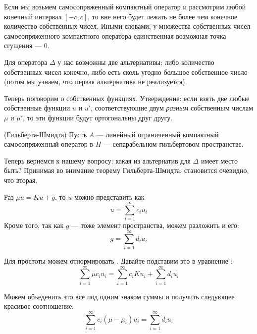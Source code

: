 

Если мы возьмем самосопряженный компактный оператор и рассмотрим любой конечный интервал $[-c, c]$, то вне него будет лежать не более чем конечное количество собственных чисел. Иными словами, у множества собственных чисел самосопряженного компактного оператора единственная возможная точка сгущения --- $0$.

Для оператора $\Delta$ у нас возможны две альтернативы: либо количество собственных чисел конечно, либо есть сколь угодно большое собственное число (потом мы узнаем, что первая альтернатива не реализуется).

Теперь поговорим о собственных функциях. Утверждение: если взять две любые собственные функции $u$ и $u'$, соответствующие двум \emph{разным} собственным числам $\mu$ и $\mu'$, то эти функции будут ортогональны друг другу.

\begin{thm*}(Гильберта-Шмидта)
  Пусть $A$ --- линейный ограниченный компактный самосопряженный оператор в $H$ --- сепарабельном гильбертовом пространстве. 
\end{thm*}

Теперь вернемся к нашему вопросу: какая из альтернатив для $\Delta$ имеет место быть? Принимая во внимание теорему Гильберта-Шмидта, становится очевидно, что вторая.



Раз $\mu u = Ku + g$, то $u$ можно представить как
\begin{equation}
  u = \sum_{i = 1}^\infty c_i u_i
\end{equation}
Кроме того, так как $g$ --- тоже элемент пространства, можем разложить и его:
\begin{equation}
  g = \sum_{i=1}^\infty d_i u_i
\end{equation}

Для простоты можем отнормировать . Давайте подставим это в уравнение :
\begin{equation}
  \sum_{i=1}^\infty \mu c_i u_i = \sum_{i=1}^\infty c_i Ku_i + \sum_{i=1}^\infty d_i u_i
\end{equation}

Можем объеденить это все под одним знаком суммы и получить следующее красивое соотношение:
\begin{equation}
  \sum_{i=1}^\infty c_i (\mu - \mu_i) u_i = \sum_{i=1}^\infty d_i u_i
\end{equation}

